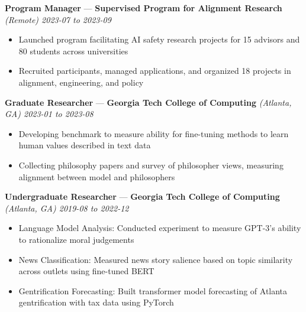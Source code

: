 \documentclass[10pt]{article}
\newcommand{\resumeSubHeading}[5]{
    \vspace*{5pt}
    \textbf{#1} — \textbf{#2} \textsl{(#3) \hfill #4 to #5}
}
\begin{document}
\resumeSubHeading
    {Program Manager}
    {Supervised Program for Alignment Research}
    {Remote}
    {2023-07}
    {2023-09}
\begin{itemize}
    \item Launched program facilitating AI safety research projects for 15 advisors and 80 students across universities
    \item Recruited participants, managed applications, and organized 18 projects in alignment, engineering, and policy
\end{itemize}


\resumeSubHeading
    {Graduate Researcher}
    {Georgia Tech College of Computing}
    {Atlanta, GA}
    {2023-01}
    {2023-08}
\begin{itemize}
    \item Developing benchmark to measure ability for fine-tuning methods to learn human values described in text data
    \item Collecting philosophy papers and survey of philosopher views, measuring alignment between model and philosophers
\end{itemize}

\resumeSubHeading
    {Undergraduate Researcher}
    {Georgia Tech College of Computing}
    {Atlanta, GA}
    {2019-08}
    {2022-12}
\begin{itemize}
    \item Language Model Analysis:
    Conducted experiment to measure GPT-3's ability to rationalize moral judgements
    \item News Classification:
    Measured news story salience based on topic similarity across outlets using fine-tuned BERT
    \item Gentrification Forecasting:
    Built transformer model forecasting of Atlanta gentrification with tax data using PyTorch
\end{itemize}
\end{document}
